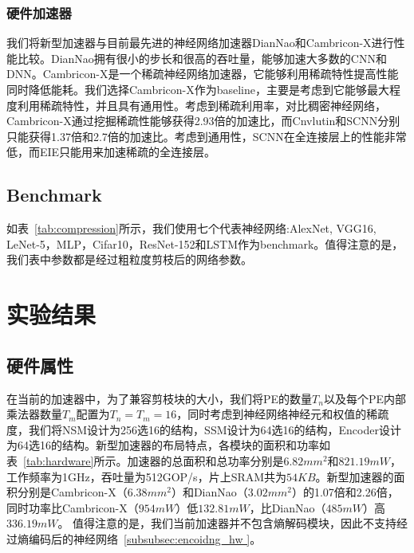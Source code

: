 \subsubsection{硬件加速器}
我们将新型加速器与目前最先进的神经网络加速器DianNao和Cambricon-X进行性能比较。DianNao拥有很小的步长和很高的吞吐量，能够加速大多数的CNN和DNN。Cambricon-X是一个稀疏神经网络加速器，它能够利用稀疏特性提高性能同时降低能耗。我们选择Cambricon-X作为baseline，主要是考虑到它能够最大程度利用稀疏特性，并且具有通用性。考虑到稀疏利用率，对比稠密神经网络，Cambricon-X通过挖掘稀疏性能够获得2.93倍的加速比，而Cnvlutin和SCNN分别只能获得1.37倍和2.7倍的加速比。考虑到通用性，SCNN在全连接层上的性能非常低，而EIE只能用来加速稀疏的全连接层。

\subsection{Benchmark}
如表~\ref{tab:compression}所示，我们使用七个代表神经网络:AlexNet, VGG16, LeNet-5，MLP，Cifar10，ResNet-152和LSTM作为benchmark。值得注意的是，我们表中参数都是经过粗粒度剪枝后的网络参数。

\section{实验结果}

\subsection{硬件属性}

在当前的加速器中，为了兼容剪枝块的大小，我们将PE的数量$T_n$以及每个PE内部乘法器数量$T_m$配置为$T_n = T_m = 16$，同时考虑到神经网络神经元和权值的稀疏度，我们将NSM设计为256选16的结构，SSM设计为64选16的结构，Encoder设计为64选16的结构。新型加速器的布局特点，各模块的面积和功率如表~\ref{tab:hardware}所示。加速器的总面积和总功率分别是$6.82mm^2$和$821.19mW$，工作频率为1GHz，吞吐量为512GOP/s，片上SRAM共为$54KB$。新型加速器的面积分别是Cambricon-X（$6.38mm^2$）和DianNao（$3.02mm^2$）的1.07倍和2.26倍，同时功率比Cambricon-X（$954mW$）低$132.81mW$，比DianNao（$485mW$）高$336.19mW$。
值得注意的是，我们当前加速器并不包含熵解码模块，因此不支持经过熵编码后的神经网络~\ref{subsubsec:encoidng_hw }。

